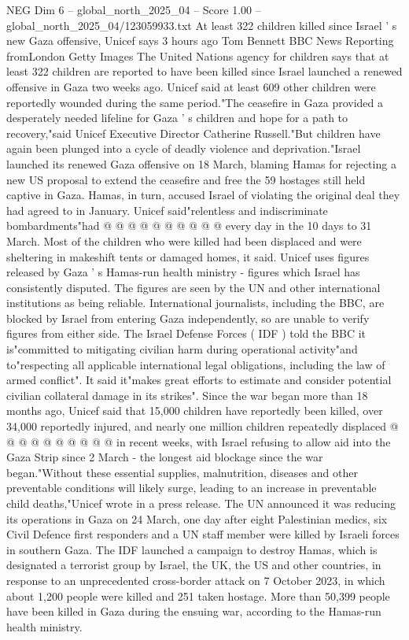 \begin{textsample}{NEG Dim 6 – global\_north\_2025\_04 – Score 1.00 – global\_north\_2025\_04/123059933.txt}  \label{ex:f6_neg_241}
At least 322 children killed since Israel ' s new Gaza offensive, Unicef says 3 hours ago Tom Bennett BBC News Reporting fromLondon Getty Images The United Nations agency for children says that at least 322 children are reported to have been killed since Israel launched a renewed offensive in Gaza two weeks ago.
Unicef said at least 609 other children were reportedly wounded during the same period."The ceasefire in Gaza provided a desperately needed lifeline for Gaza ' s children and hope for a path to recovery,"said Unicef Executive Director Catherine Russell."But children have again been plunged into a cycle of deadly violence and deprivation."Israel launched its renewed Gaza offensive on 18 March, blaming Hamas for rejecting a new US proposal to extend the ceasefire and free the 59 hostages still held captive in Gaza.
Hamas, in turn, accused Israel of violating the original deal they had agreed to in January.
Unicef said"relentless and indiscriminate bombardments"had @ @ @ @ @ @ @ @ @ @ every day in the 10 days to 31 March.
Most of the children who were killed had been displaced and were sheltering in makeshift tents or damaged homes, it said.
Unicef uses figures released by Gaza ' s Hamas-run health ministry - figures which Israel has consistently disputed.
The figures are seen by the UN and other international institutions as being reliable.
International journalists, including the BBC, are blocked by Israel from entering Gaza independently, so are unable to verify figures from either side.
The Israel Defense Forces ( IDF ) told the BBC it is"committed to mitigating civilian harm during operational activity"and to"respecting all applicable international legal obligations, including the law of armed conflict".
It said it"makes great efforts to estimate and consider potential civilian collateral damage in its strikes".
Since the war began more than 18 months ago, Unicef said that 15,000 children have reportedly been killed, over 34,000 reportedly injured, and nearly one million children repeatedly displaced @ @ @ @ @ @ @ @ @ @ in recent weeks, with Israel refusing to allow aid into the Gaza Strip since 2 March - the longest aid blockage since the war began."Without these essential supplies, malnutrition, diseases and other preventable conditions will likely surge, leading to an increase in preventable child deaths,"Unicef wrote in a press release.
The UN announced it was reducing its operations in Gaza on 24 March, one day after eight Palestinian medics, six Civil Defence first responders and a UN staff member were killed by Israeli forces in southern Gaza.
The IDF launched a campaign to destroy Hamas, which is designated a terrorist group by Israel, the UK, the US and other countries, in response to an unprecedented cross-border attack on 7 October 2023, in which about 1,200 people were killed and 251 taken hostage.
More than 50,399 people have been killed in Gaza during the ensuing war, according to the Hamas-run health ministry.

\end{textsample}
